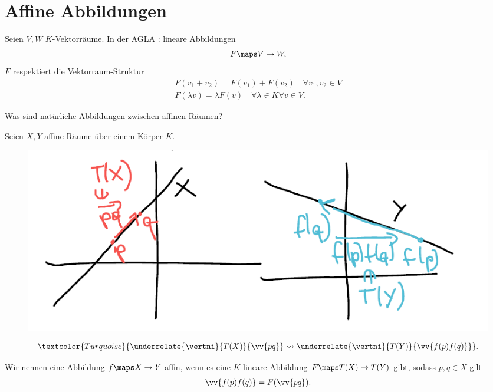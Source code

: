 \section{Affine Abbildungen}
Seien \( V,W \) \( K \)-Vektorräume.
In der AGLA : lineare Abbildungen
\begin{align*}
    F\maps V\to W,
\end{align*}
\dh \( F \) respektiert die Vektorraum-Struktur
\begin{align*}
    F(v_1+v_2)=F(v_1)+F(v_2)\quad\forall v_1,v_2\in V\\
    F(\lambda v)=\lambda F(v)\quad \forall\lambda\in K \forall v \in V.
\end{align*}
\begin{frage*}
    Was sind natürliche Abbildungen zwischen affinen Räumen?
\end{frage*}
Seien \( X, Y \) affine Räume über einem Körper \( K \).
\begin{figure}[H]
    \centering
    \includegraphics[width=0.8\linewidth]{figures/affine_Abbildungen}
    \label{fig:affine_Abbildungen}
\end{figure}
\begin{align*}
    \textcolor{Turquoise}{\underrelate{\vertni}{T(X)}{\vv{pq}}\rightsquigarrow\underrelate{\vertni}{T(Y)}{\vv{f(p)f(q)}}}.
\end{align*}
\begin{definition*}
    Wir nennen eine Abbildung \( f\maps X \to Y \) affin, wenn es eine \( K \)-lineare Abbildung \( F\maps T(X)\to T(Y) \) gibt, sodass \tforall \( p,q\in X \) gilt
    \begin{align*}
        \vv{f(p)f(q)}=F(\vv{pq}).
    \end{align*}
\end{definition*}
